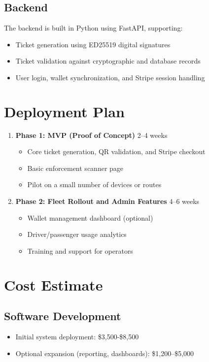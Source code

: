 \documentclass[12pt]{article}
\begin{document}
\subsection{Backend}
The backend is built in Python using FastAPI, supporting:
\begin{itemize}
    \item Ticket generation using ED25519 digital signatures
    \item Ticket validation against cryptographic and database records
    \item User login, wallet synchronization, and Stripe session handling
\end{itemize}

\section{Deployment Plan}
\begin{enumerate}
    \item \textbf{Phase 1: MVP (Proof of Concept)} \hfill 2–4 weeks
    \begin{itemize}
        \item Core ticket generation, QR validation, and Stripe checkout
        \item Basic enforcement scanner page
        \item Pilot on a small number of devices or routes
    \end{itemize}

    \item \textbf{Phase 2: Fleet Rollout and Admin Features} \hfill 4–6 weeks
    \begin{itemize}
        \item Wallet management dashboard (optional)
        \item Driver/passenger usage analytics
        \item Training and support for operators
    \end{itemize}
\end{enumerate}

\section{Cost Estimate}
\subsection*{Software Development}
\begin{itemize}
    \item Initial system deployment: \$3,500-\$8,500
    \item Optional expansion (reporting, dashboards): \$1,200–\$5,000
\end{itemize}
\end{document}
